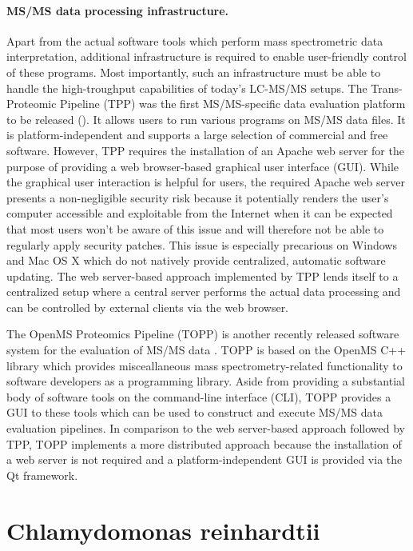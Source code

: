 \paragraph{MS/MS data processing infrastructure.}

Apart from the actual software tools which perform mass spectrometric data 
interpretation, additional infrastructure is required to enable user-friendly 
control of these programs.
Most importantly, such an infrastructure must be able to handle the 
high-troughput capabilities of today's LC-MS/MS setups.
The Trans-Proteomic Pipeline (TPP) was the first MS/MS-specific data evaluation 
platform to be released (\cite{Keller2005}).
It allows users to run various programs on MS/MS data files.
It is platform-independent and supports a large selection of commercial and
free software.
However, TPP requires the installation of an Apache web server for the purpose
of providing a web browser-based graphical user interface (GUI).
While the graphical user interaction is helpful for users, the required Apache 
web server presents a non-negligible security risk because it potentially renders 
the user's computer accessible and exploitable from the Internet when it can be 
expected that most users won't be aware of this issue and will therefore not 
be able to regularly apply security patches. 
This issue is especially precarious on Windows and Mac OS X which do not 
natively provide centralized, automatic software updating.
The web server-based approach implemented by TPP lends itself to a centralized
setup where a central server performs the actual data processing and can
be controlled by external clients via the web browser.

The OpenMS Proteomics Pipeline (TOPP) is another recently released software 
system for the evaluation of MS/MS data \citep{Kohlbacher2007}.
TOPP is based on the OpenMS C++ library which provides misceallaneous mass 
spectrometry-related functionality to software developers as a programming 
library.
Aside from providing a substantial body of software tools on the command-line 
interface (CLI), TOPP provides a GUI to these tools which can be used to
construct and execute MS/MS data evaluation pipelines.
In comparison to the web server-based approach followed by TPP, TOPP implements
a more distributed approach because the installation of a web server is not
required and a platform-independent GUI is provided via the Qt framework.

\section{Chlamydomonas reinhardtii}


